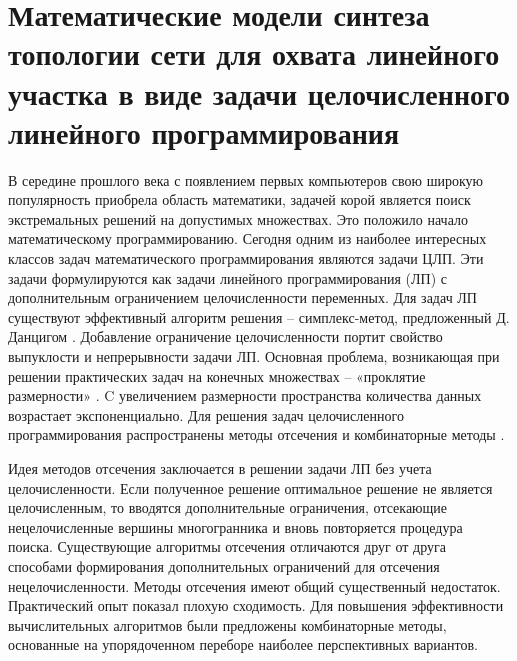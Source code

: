 

\section{Математические модели синтеза топологии сети для охвата линейного участка в виде задачи целочисленного линейного программирования}

В середине прошлого века с появлением первых компьютеров свою широкую популярность приобрела область математики, задачей корой является поиск экстремальных решений на допустимых множествах. Это положило начало математическому программированию. Сегодня одним из наиболее интересных классов задач математического программирования являются задачи ЦЛП. Эти задачи формулируются как задачи линейного программирования (ЛП) с дополнительным ограничением целочисленности переменных. Для задач ЛП существуют эффективный алгоритм решения -- симплекс-метод, предложенный Д. Данцигом \cite{Dantzig1963}. Добавление ограничение целочисленности портит свойство выпуклости и непрерывности задачи ЛП. Основная проблема, возникающая при решении практических задач на конечных множествах --  «проклятие размерности» \cite{Pershin2013}. C увеличением размерности пространства количества данных возрастает экспоненциально. Для решения задач целочисленного программирования распространены методы отсечения и комбинаторные методы \cite{Alekseev1987, Sukharev1986}. 

Идея методов отсечения заключается в решении задачи ЛП без учета целочисленности. Если полученное решение оптимальное решение не является целочисленным, то вводятся дополнительные ограничения, отсекающие нецелочисленные вершины многогранника и вновь повторяется процедура поиска. Существующие алгоритмы отсечения отличаются друг от друга способами формирования дополнительных ограничений для отсечения нецелочисленности. Методы отсечения имеют общий существенный недостаток. Практический опыт показал плохую сходимость. Для повышения эффективности вычислительных алгоритмов были предложены комбинаторные методы, основанные на упорядоченном переборе наиболее перспективных вариантов. 



